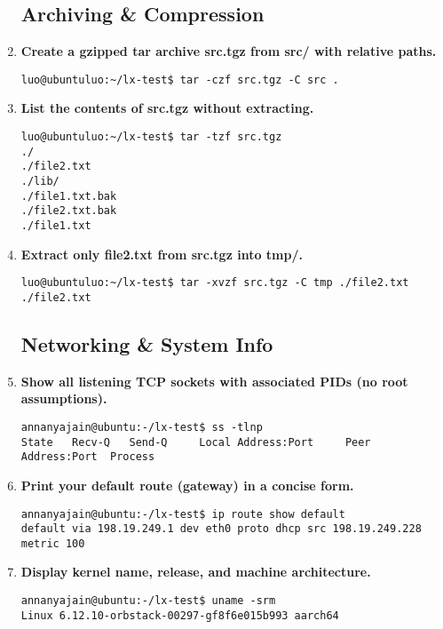 \begin{enumerate}[leftmargin=2em]
\begin{Verbatim}[formatcom=\color{blue}]
\end{Verbatim}

\subsection{Archiving \& Compression}

\item \textbf{Create a gzipped tar archive src.tgz from src/ with relative paths.}
\begin{Verbatim}[formatcom=\color{blue}]
luo@ubuntuluo:~/lx-test$ tar -czf src.tgz -C src .
\end{Verbatim}

\item \textbf{List the contents of src.tgz without extracting.}
\begin{Verbatim}[formatcom=\color{blue}]
luo@ubuntuluo:~/lx-test$ tar -tzf src.tgz
./
./file2.txt
./lib/
./file1.txt.bak
./file2.txt.bak
./file1.txt

\end{Verbatim}

\item \textbf{Extract only file2.txt from src.tgz into tmp/.}
\begin{Verbatim}[formatcom=\color{blue}]
luo@ubuntuluo:~/lx-test$ tar -xvzf src.tgz -C tmp ./file2.txt
./file2.txt

\end{Verbatim}

\subsection{Networking \& System Info}

\item \textbf{Show all listening TCP sockets with associated PIDs (no root assumptions).}
\begin{Verbatim}[formatcom=\color{blue}]
annanyajain@ubuntu:-/lx-test$ ss -tlnp
State   Recv-Q   Send-Q     Local Address:Port     Peer Address:Port  Process 
\end{Verbatim}

\item \textbf{Print your default route (gateway) in a concise form.}
\begin{Verbatim}[formatcom=\color{blue}]
annanyajain@ubuntu:-/lx-test$ ip route show default
default via 198.19.249.1 dev eth0 proto dhcp src 198.19.249.228 metric 100 
\end{Verbatim}

\item \textbf{Display kernel name, release, and machine architecture.}
\begin{Verbatim}[formatcom=\color{blue}]
annanyajain@ubuntu:-/lx-test$ uname -srm
Linux 6.12.10-orbstack-00297-gf8f6e015b993 aarch64
\end{Verbatim}


\end{enumerate}
